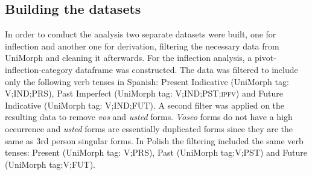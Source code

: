 \documentclass[12pt]{article}
\begin{document}

\subsection{Building the datasets} \label{building-data}

In order to conduct the analysis two separate datasets were built, one for inflection and another one for derivation, filtering the necessary data from UniMorph and cleaning it afterwards. For the inflection analysis, a pivot-inflection-category dataframe was constructed. The data was filtered to include only the following verb tenses in Spanish: Present Indicative (UniMorph tag: V;IND;PRS), Past Imperfect (UniMorph tag: V;IND;PST;\textsc{ipfv}) and Future Indicative (UniMorph tag: V;IND;FUT). A second filter was applied on the resulting data to remove \textit{vos} and \textit{usted} forms. \textit{Voseo} forms do not have a high occurrence and \textit{usted} forms are essentially duplicated forms since they are the same as 3rd person singular forms. In Polish the filtering included the same verb tenses: Present (UniMorph tag: V;PRS), Past (UniMorph tag:V;PST) and Future (UniMorph tag:V;FUT).


\end{document}
